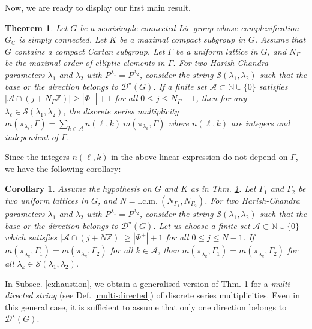 \documentclass[11 pt]{amsart}
\newcommand{\Z}{{\mathbb Z}}
\newcommand{\N}{{\mathbb N}}
\newcommand{\C}{{\mathbb C}}
\newtheorem{theorem}{Theorem}[section]
\newtheorem{corollary}{Corollary}[section]
\theoremstyle{definition}
\numberwithin{equation}{section}
\begin{document}
\noindent Now, we are ready to display our first main result. 
\begin{theorem}\label{thm1}
\textit{Let $G$ be a semisimple connected Lie group whose complexification $G_{\C}$ is simply connected. Let $K$ be a maximal compact subgroup in $G$. Assume that $G$ contains a compact Cartan subgroup. Let $\Gamma$ be a uniform lattice in $G$, and $N_{\Gamma}$ be the maximal order of elliptic elements in $\Gamma$. For two Harish-Chandra parameters $\lambda_1$ and $\lambda_2$ with $P^{\lambda_1}=P^{\lambda_2}$, consider the string $\mathcal{S}(\lambda_1, \lambda_2)$ such that the base or the direction belongs to $\mathcal{D}^{\star}(G)$. If a finite set $\mathcal{A} \subset \N \cup \{0\}$ satisfies $| \mathcal{A} \cap (j+N_{\Gamma} \Z)| \geq |\Phi^+| +1$ for all $0 \leq j \leq N_{\Gamma}-1$, then for any $\lambda_{\ell} \in \mathcal{S}(\lambda_1, \lambda_2)$, the discrete series multiplicity $m(\pi_{\lambda_{\ell}} , \Gamma) = \sum\limits_{k \in \mathcal{A}} n(\ell, k)\ m(\pi_{\lambda_{k}} , \Gamma)$ where $n(\ell, k)$ are integers and independent of $\Gamma$.}
\end{theorem}


\noindent Since the integers $n(\ell, k)$ in the above linear expression do not depend on $\Gamma$, we have the following corollary: 

\begin{corollary}\label{cor1}
\textit{Assume the hypothesis on $G$ and $K$ as in Thm. \ref{thm1}. Let $\Gamma_1$ and $\Gamma_2$ be two uniform lattices in $G$, and $N= \text{l.c.m.}\ ( N_{\Gamma_1} , N_{\Gamma_2})$. For two Harish-Chandra parameters $\lambda_1$ and $\lambda_2$ with $P^{\lambda_1}=P^{\lambda_2}$, consider the string $\mathcal{S}(\lambda_1, \lambda_2)$ such that the base or the direction belongs to $\mathcal{D}^{\star}(G)$. Let us choose a finite set $\mathcal{A} \subset \N \cup \{0\}$ which satisfies $| \mathcal{A} \cap ( j + N \Z )| \geq |\Phi^+| +1$ for all $ 0 \leq j \leq N-1$. If $m(\pi_{\lambda_k}, \Gamma_1)= m(\pi_{\lambda_k}, \Gamma_2)$ for all $k \in \mathcal{A}$, then $m(\pi_{\lambda_k}, \Gamma_1)= m(\pi_{\lambda_k}, \Gamma_2)$ for all $\lambda_k \in \mathcal{S}(\lambda_1, \lambda_2)$.} 
\end{corollary}



\noindent In Subsec. \ref{exhaustion}, we obtain a generalised version of Thm. \ref{thm1} for a \textit{multi-directed string} (see Def. \ref{multi-directed}) of discrete series multiplicities. Even in this general case, it is sufficient to assume that only one direction belongs to $\mathcal{D}^{\star}(G)$.
\end{document}
